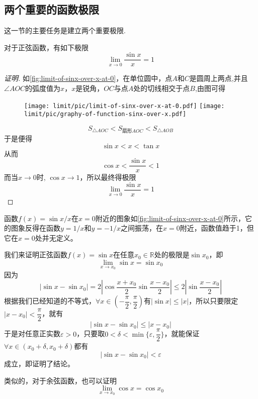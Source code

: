 \subsection{两个重要的函数极限}
\label{sec:two-important-function-limit}

这一节的主要任务是建立两个重要极限.

\begin{theorem}
  \label{theorem:sinx-over-x-to-1-when-x-to-0}
  对于正弦函数，有如下极限
  \[ \lim_{x \to 0} \frac{\sin{x}}{x} = 1 \]
\end{theorem}

\begin{proof}[证明]

  如\autoref{fig:limit-of-sinx-over-x-at-0}，在单位圆中，点$A$和$C$是圆周上两点,并且$\angle AOC$的弧度值为$x$，$x$是锐角，$OC$与点$A$处的切线相交于点$B$,由图可得
  
\begin{figure}[htbp]
\centering
\texttt{[image: limit/pic/limit-of-sinx-over-x-at-0.pdf]}
\texttt{[image: limit/pic/graphy-of-function-sinx-over-x.pdf]}
\caption{}
\label{fig:limit-of-sinx-over-x-at-0}
\end{figure}

  \[ S_{\triangle AOC} < S_{\text{扇形}AOC} < S_{\triangle AOB} \]
  于是便得
  \[ \sin{x} < x < \tan{x} \]
  从而
  \[ \cos{x} < \frac{\sin{x}}{x} < 1 \]
  而当$x \to 0$时, $\cos{x} \to 1$，所以最终得极限
  \[ \lim_{x \to 0} \frac{\sin{x}}{x} = 1 \]
\end{proof}

函数$f(x)=\sin{x}/x$在$x=0$附近的图象如\autoref{fig:limit-of-sinx-over-x-at-0}所示，它的图象反得在函数$y=1/x$和$y=-1/x$之间振荡，在$x=0$附近，函数值趋于1，但它在$x=0$处并无定义。

\begin{example}
  \label{example:limit-of-sin-cos-function}
  我们来证明正弦函数$f(x)=\sin{x}$在任意$x_0 \in \mathbb{R}$处的极限是$\sin{x_0}$，即
  \[ \lim_{x \to x_0} \sin{x} = \sin{x_0} \]
  因为
  \[ |\sin{x}-\sin{x_0}| = 2 \left| \cos{\frac{x+x_0}{2}} \sin{\frac{x-x_0}{2}} \right| \leqslant 2 \left| \sin{\frac{x-x_0}{2}} \right| \]
  根据我们已经知道的不等式，$\forall x \in \left(- \dfrac{\pi}{2}, \dfrac{\pi}{2} \right)$有$|\sin{x}| \leqslant |x|$，所以只要限定$|x-x_0|<\dfrac{\pi}{2}$，就有
  \[ |\sin{x}-\sin{x_0}| \leqslant |x-x_0| \]
  于是对任意正实数$\varepsilon>0$，只要取$0<\delta<\min\{\varepsilon, \dfrac{\pi}{2}\}$，就能保证$\forall x \in ( x_0+\delta,x_0+\delta )$都有
  \[ |\sin{x}-\sin{x_0}| < \varepsilon \]
  成立，即证明了结论。

  类似的，对于余弦函数，也可以证明
  \[ \lim_{x \to x_0} \cos{x} = \cos{x_0} \]
\end{example}

